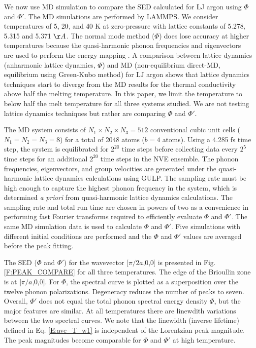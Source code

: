 \documentclass[letterpaper,12pt]{article}
\begin{document}
We now use MD simulation to compare the SED calculated for LJ argon using $\Phi$ and $\Phi'$. The MD simulations are performed by LAMMPS.\cite{LAMMPS} We consider temperatures of 5, 20, and 40 K at zero-pressure with lattice constants of 5.278, 5.315 and 5.371 $\AA$. The normal mode method ($\Phi$) does lose accuracy
at higher temperatures because the quasi-harmonic phonon frequencies and
eigenvectors are used to perform the energy mapping
.\cite{turney2009a} A comparison between lattice dynamics (anharmonic lattice dynamics, $\Phi$) and MD (non-equilibrium direct-MD, equilibrium using Green-Kubo method) for LJ argon shows that lattice dynamics techniques start to diverge from the MD results for the thermal conductivity above half the melting temperature.\cite{turney2009a} In this paper, we limit the temperature to below half the melt temperature for all three systems studied. We are not testing lattice dynamics techniques but rather are comparing $\Phi$ and $\Phi'$.

The MD system consists of $N_1 \times N_2 \times N_3=512$ conventional cubic unit cells ($N_1=N_2=N_3=8$) for a total of 2048 atoms ($b=4$ atoms). Using a 4.285 fs time step, the system is equilibrated for $2^{20}$ time steps before collecting data every $2^5$ time steps for an additional $2^{20}$ time steps in the NVE ensemble.\cite{mcquarrie2000} The phonon frequencies, eigenvectors, and group velocities are generated under the quasi-harmonic lattice dynamics calculations using GULP.\cite{GULP} The sampling rate must be high enough to capture the highest phonon frequency in the system, which is determined {\em a priori} from quasi-harmonic lattice dynamics calculations. The sampling rate and total run time are chosen in powers of two as a convenience in performing fast Fourier transforms required to efficiently evaluate $\Phi$ and $\Phi'$. The same MD simulation data is used to calculate $\Phi$ and $\Phi'$.  Five simulations with different initial conditions are performed and the $\Phi$ and $\Phi'$ values are averaged before the peak fitting.

The SED ($\Phi$ and $\Phi'$) for the wavevector [$\pi/2a$,0,0] is presented in Fig$.$ \ref{F:PEAK_COMPARE} for all three temperatures. The edge of the Brioullin zone is at [$\pi/a$,0,0].  For $\Phi$, the spectral curve is plotted as a superposition over the twelve phonon polarizations. Degeneracy reduces the number of peaks to seven.  Overall, $\Phi'$ does not equal the total phonon spectral energy density $\Phi$, but the major features are similar. At all temperatures there are linewdith variations between the two spectral curves. We note that the linewidth (inverse lifetime) defined in Eq$.$ \eqref{E:ave_T_w1} is independent of the Lorentzian peak magnitude. The peak magnitudes become comparable for $\Phi$ and $\Phi'$ at high temperature.
\end{document}
